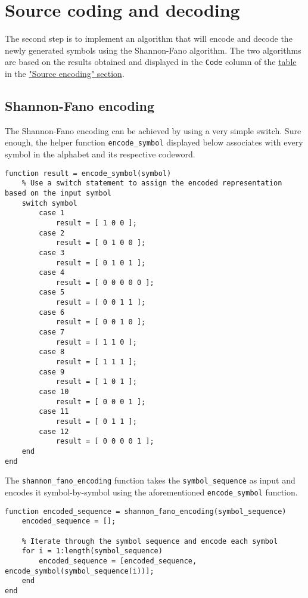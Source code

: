 \vspace{40px} \section{Source coding and decoding}
The second step is to implement an algorithm that will encode and decode the newly generated symbols using the Shannon-Fano algorithm. The two algorithms are based on the results obtained and displayed in the \texttt{Code} column of the \hyperref[tab:shannon-fano]{table} in the \hyperref[source-encoding]{"Source encoding" section}.

\subsection{Shannon-Fano encoding}\label{source-coding}
The Shannon-Fano encoding can be achieved by using a very simple switch. Sure enough, the helper function \texttt{encode\_symbol} displayed below associates with every symbol in the alphabet and its respective codeword.

\begin{lstlisting}
function result = encode_symbol(symbol)
    % Use a switch statement to assign the encoded representation based on the input symbol
    switch symbol
        case 1
            result = [ 1 0 0 ];
        case 2
            result = [ 0 1 0 0 ];
        case 3 
            result = [ 0 1 0 1 ];
        case 4 
            result = [ 0 0 0 0 0 ];
        case 5 
            result = [ 0 0 1 1 ];
        case 6 
            result = [ 0 0 1 0 ];
        case 7 
            result = [ 1 1 0 ];
        case 8 
            result = [ 1 1 1 ];
        case 9 
            result = [ 1 0 1 ];
        case 10 
            result = [ 0 0 0 1 ];
        case 11 
            result = [ 0 1 1 ];
        case 12
            result = [ 0 0 0 0 1 ];
    end
end
\end{lstlisting}

\noindent The \texttt{shannon\_fano\_encoding} function takes the \texttt{symbol\_sequence} as input and encodes it symbol-by-symbol using the aforementioned \texttt{encode\_symbol} function.

\begin{lstlisting}
function encoded_sequence = shannon_fano_encoding(symbol_sequence)
    encoded_sequence = [];
    
    % Iterate through the symbol sequence and encode each symbol
    for i = 1:length(symbol_sequence)
        encoded_sequence = [encoded_sequence, encode_symbol(symbol_sequence(i))];
    end
end
\end{lstlisting}

